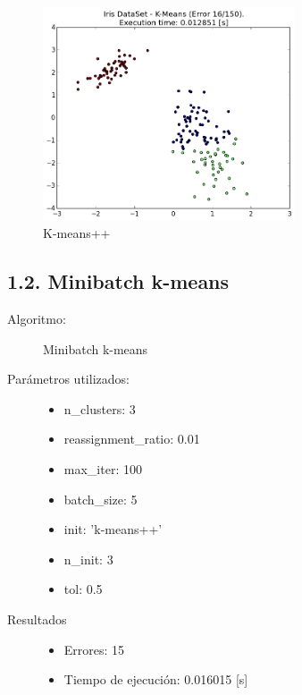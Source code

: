 \documentclass{article}
\begin{document}
\begin{figure}[H]
  \centering
  \includegraphics[width=0.666\textwidth]{img/K-Means.png}
  \caption{K-means++}
\end{figure}
\newpage



\subsection*{1.2. \; Minibatch k-means}
\begin{description}
  \item[Algoritmo:] Minibatch k-means
  \item[Parámetros utilizados:] \hfill
    \begin{itemize}
      \item n\_clusters: 3
      \item reassignment\_ratio: 0.01
      \item max\_iter: 100
      \item batch\_size: 5
      \item init: 'k-means++'
      \item n\_init: 3
      \item tol: 0.5
    \end{itemize}
  \item[Resultados]\hfill
    \begin{itemize}
      \item Errores: 15
      \item Tiempo de ejecución: 0.016015 [s]
    \end{itemize}
\end{description}
\end{document}

